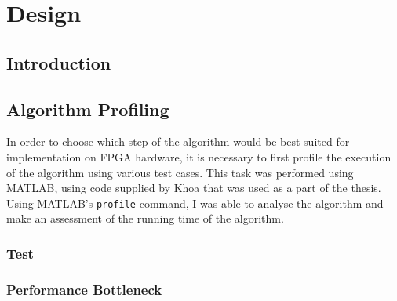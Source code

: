 \chapter{Design}
\label{ch:design}

\section{Introduction}
\label{sec:designIntroduction}

\section{Algorithm Profiling}
\label{sec:algorithmProfiling}
In order to choose which step of the algorithm would be best suited for 
implementation on FPGA hardware, it is necessary to first profile the execution 
of the algorithm using various test cases. This task was performed using MATLAB,
using code supplied by Khoa that was used as a part of the thesis. Using 
MATLAB's \verb+profile+ command, I was able to analyse the algorithm and make an
assessment of the running time of the algorithm.

\subsection{Test}


\subsection{Performance Bottleneck}
\label{sec:algorithmPerformanceBottleneck}

\lstset{numbers=left,tabsize=2,language=Matlab}
\begin{lstlisting}

\end{lstlisting}
